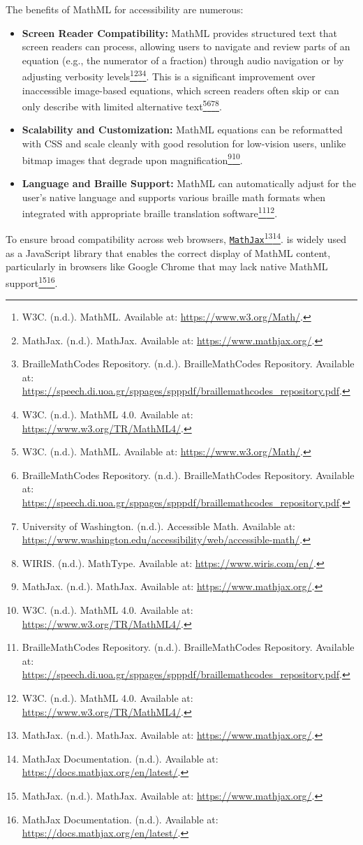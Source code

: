 The benefits of MathML for accessibility are numerous:
\begin{itemize}
    \item \textbf{Screen Reader Compatibility:} MathML provides structured text that screen readers can process, allowing users to navigate and review parts of an equation (e.g., the numerator of a fraction) through audio navigation or by adjusting verbosity levels\footnote{W3C. (n.d.). MathML. Available at: \url{https://www.w3.org/Math/}.}\footnote{MathJax. (n.d.). MathJax. Available at: \url{https://www.mathjax.org/}.}\footnote{BrailleMathCodes Repository. (n.d.). BrailleMathCodes Repository. Available at: \url{https://speech.di.uoa.gr/sppages/spppdf/braillemathcodes_repository.pdf}.}\footnote{W3C. (n.d.). MathML 4.0. Available at: \url{https://www.w3.org/TR/MathML4/}.}. This is a significant improvement over inaccessible image-based equations, which screen readers often skip or can only describe with limited alternative text\footnote{W3C. (n.d.). MathML. Available at: \url{https://www.w3.org/Math/}.}\footnote{BrailleMathCodes Repository. (n.d.). BrailleMathCodes Repository. Available at: \url{https://speech.di.uoa.gr/sppages/spppdf/braillemathcodes_repository.pdf}.}\footnote{University of Washington. (n.d.). Accessible Math. Available at: \url{https://www.washington.edu/accessibility/web/accessible-math/}.}\footnote{WIRIS. (n.d.). MathType. Available at: \url{https://www.wiris.com/en/}.}.
    \item \textbf{Scalability and Customization:} MathML equations can be reformatted with CSS and scale cleanly with good resolution for low-vision users, unlike bitmap images that degrade upon magnification\footnote{MathJax. (n.d.). MathJax. Available at: \url{https://www.mathjax.org/}.}\footnote{W3C. (n.d.). MathML 4.0. Available at: \url{https://www.w3.org/TR/MathML4/}.}.
    \item \textbf{Language and Braille Support:} MathML can automatically adjust for the user's native language and supports various braille math formats when integrated with appropriate braille translation software\footnote{BrailleMathCodes Repository. (n.d.). BrailleMathCodes Repository. Available at: \url{https://speech.di.uoa.gr/sppages/spppdf/braillemathcodes_repository.pdf}.}\footnote{W3C. (n.d.). MathML 4.0. Available at: \url{https://www.w3.org/TR/MathML4/}.}.
\end{itemize}
To ensure broad compatibility across web browsers, \href{https://www.mathjax.org/}{\texttt{MathJax}}\footnote{MathJax. (n.d.). MathJax. Available at: \url{https://www.mathjax.org/}.}\footnote{MathJax Documentation. (n.d.). Available at: \url{https://docs.mathjax.org/en/latest/}.}. is widely used as a JavaScript library that enables the correct display of MathML content, particularly in browsers like Google Chrome that may lack native MathML support\footnote{MathJax. (n.d.). MathJax. Available at: \url{https://www.mathjax.org/}.}\footnote{MathJax Documentation. (n.d.). Available at: \url{https://docs.mathjax.org/en/latest/}.}.

